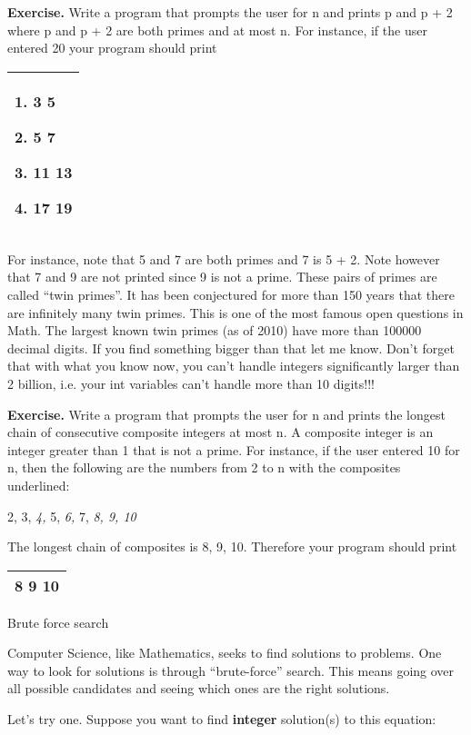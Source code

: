 \documentclass[
]{article}
\begin{document}
\textbf{Exercise.} Write a program that prompts the user for n and
prints p and p + 2 where p and p + 2 are both primes and at most n. For
instance, if the user entered 20 your program should print

\begin{longtable}[]{@{}l@{}}
\toprule
\endhead
\begin{minipage}[t]{0.97\columnwidth}\raggedright
1. 3 5

2. 5 7

3. 11 13

4. 17 19\strut
\end{minipage}\tabularnewline
\bottomrule
\end{longtable}

For instance, note that 5 and 7 are both primes and 7 is 5 + 2. Note
however that 7 and 9 are not printed since 9 is not a prime. These pairs
of primes are called ``twin primes''. It has been conjectured for more
than 150 years that there are infinitely many twin primes. This is one
of the most famous open questions in Math. The largest known twin primes
(as of 2010) have more than 100000 decimal digits. If you find something
bigger than that let me know. Don't forget that with what you know now,
you can't handle integers significantly larger than 2 billion, i.e. your
int variables can't handle more than 10 digits!!!

\textbf{Exercise.} Write a program that prompts the user for n and
prints the longest chain of consecutive composite integers at most n. A
composite integer is an integer greater than 1 that is not a prime. For
instance, if the user entered 10 for n, then the following are the
numbers from 2 to n with the composites underlined:

2, 3, \emph{4,} 5, \emph{6,} 7, \emph{8, 9, 10}

The longest chain of composites is 8, 9, 10. Therefore your program
should print

\begin{longtable}[]{@{}l@{}}
\toprule
\endhead
8 9 10\tabularnewline
\bottomrule
\end{longtable}

Brute force search

Computer Science, like Mathematics, seeks to find solutions to problems.
One way to look for solutions is through ``brute-force'' search. This
means going over all possible candidates and seeing which ones are the
right solutions.

Let's try one. Suppose you want to find \textbf{integer} solution(s) to
this equation:
\end{document}
